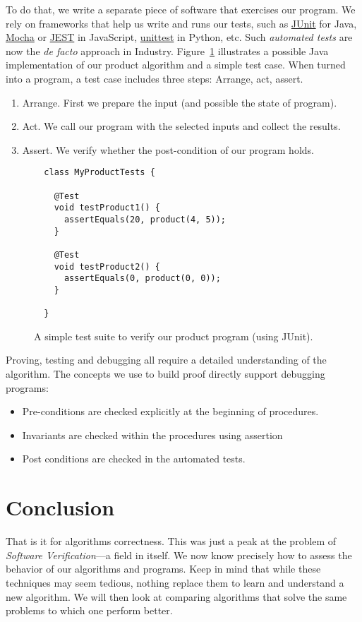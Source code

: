\documentclass{aldast}
\begin{document}
To do that, we write a separate piece of software that exercises our
program. We rely on frameworks that help us write and runs our tests,
such as \href{https://junit.org/junit5/}{JUnit} for Java,
\href{https://mochajs.org}{Mocha} or \href{https://jestjs.io}{JEST} in
JavaScript,
\href{https://docs.python.org/3/library/unittest.html}{unittest} in
Python, etc. Such \emph{automated tests} are now the {\it de facto}
approach in Industry. Figure~\ref{fig:junit} illustrates a possible
Java implementation of our product algorithm and a simple test
case. When turned into a program, a test case includes three steps:
Arrange, act, assert.
\begin{enumerate}
\item Arrange. First we prepare the input (and possible the state of
  program).
\item Act. We call our program with the selected inputs and collect
  the results.
\item Assert. We verify whether the post-condition of our program holds.
\end{enumerate}

\begin{figure}[htbp]
\begin{verbatim}
  class MyProductTests {

    @Test
    void testProduct1() {
      assertEquals(20, product(4, 5));
    }

    @Test
    void testProduct2() {
      assertEquals(0, product(0, 0));
    }

  }
  \end{verbatim}
  \caption{A simple test suite to verify our product program (using JUnit).}
  \label{fig:junit}
\end{figure}

\begin{takeaway}
  Proving, testing and debugging all require a detailed understanding
  of the algorithm. The concepts we use to build proof directly
  support debugging programs:
  \begin{itemize}
  \item Pre-conditions are checked explicitly at the beginning of
    procedures.
  \item Invariants are checked within the procedures using assertion
  \item Post conditions are checked in the automated tests.
  \end{itemize}
\end{takeaway}


\section*{Conclusion}
That is it for algorithms correctness. This was just a peak at the problem
of \emph{Software Verification}---a field in itself. We now know
precisely how to assess the behavior of our algorithms and
programs. Keep in mind that while these techniques may seem tedious,
nothing replace them to learn and understand a new algorithm. We will
then look at comparing algorithms that solve the same problems to
which one perform better.



\end{document}
